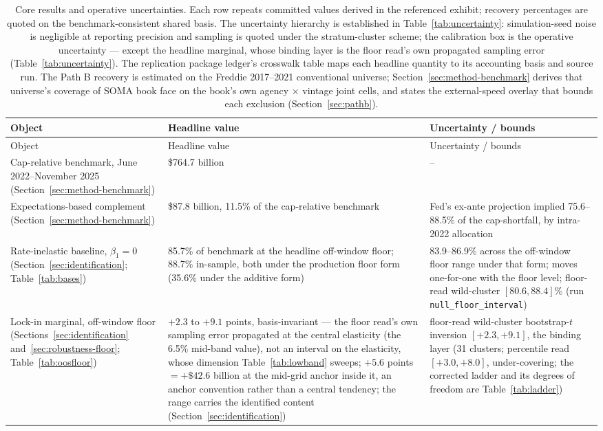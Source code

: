 {\footnotesize
\begin{longtable}{@{}p{4.6cm}p{4.6cm}p{5.3cm}@{}}
\caption{Core results and operative uncertainties. Each row repeats committed values derived in the referenced exhibit; recovery percentages are quoted on the benchmark-consistent shared basis. The uncertainty hierarchy is established in Table~\ref{tab:uncertainty}: simulation-seed noise is negligible at reporting precision and sampling is quoted under the stratum-cluster scheme; the calibration box is the operative uncertainty --- except the headline marginal, whose binding layer is the floor read's own propagated sampling error (Table~\ref{tab:uncertainty}). The replication package ledger's crosswalk table maps each headline quantity to its accounting basis and source run. The Path B recovery is estimated on the Freddie 2017--2021 conventional universe; Section~\ref{sec:method-benchmark} derives that universe's coverage of SOMA book face on the book's own agency $\times$ vintage joint cells, and states the external-speed overlay that bounds each exclusion (Section~\ref{sec:pathb}).}
\label{tab:headline}\\
\toprule
Object & Headline value & Uncertainty / bounds \\
\midrule
\endfirsthead
\toprule
Object & Headline value & Uncertainty / bounds \\
\midrule
\endhead
Cap-relative benchmark, June 2022--November 2025 (Section~\ref{sec:method-benchmark}) & \$764.7 billion & -- \\
Expectations-based complement (Section~\ref{sec:method-benchmark}) & \$87.8 billion, 11.5\% of the cap-relative benchmark & Fed's ex-ante projection implied 75.6--88.5\% of the cap-shortfall, by intra-2022 allocation \\
Rate-inelastic baseline, $\beta_1 = 0$ (Section~\ref{sec:identification}; Table~\ref{tab:bases}) & 85.7\% of benchmark at the headline off-window floor; 88.7\% in-sample, both under the production floor form (35.6\% under the additive form) & 83.9--86.9\% across the off-window floor range under that form; moves one-for-one with the floor level; floor-read wild-cluster $[80.6, 88.4]$\% (run \texttt{null\_floor\_interval}) \\
Lock-in marginal, off-window floor (Sections~\ref{sec:identification} and~\ref{sec:robustness-floor}; Table~\ref{tab:oosfloor}) & $+2.3$ to $+9.1$ points, basis-invariant --- the floor read's own sampling error propagated at the central elasticity (the 6.5\% mid-band value), not an interval on the elasticity, whose dimension Table~\ref{tab:lowband} sweeps; $+5.6$ points $= +\$42.6$ billion at the mid-grid anchor inside it, an anchor convention rather than a central tendency; the range carries the identified content (Section~\ref{sec:identification}) & floor-read wild-cluster bootstrap-$t$ inversion $[+2.3, +9.1]$, the binding layer (31 clusters; percentile read $[+3.0, +8.0]$, under-covering; the corrected ladder and its degrees of freedom are Table~\ref{tab:ladder}) \\

\end{longtable}}
